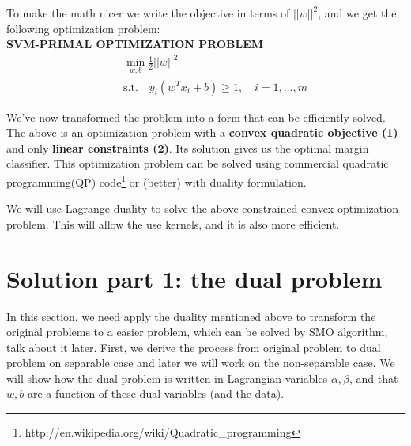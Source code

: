 \documentclass[a4paper]{article}
\begin{document}
To make the math nicer we write the objective in terms of $||w||^2$, and we get the following optimization problem:\\

\textbf{SVM-PRIMAL OPTIMIZATION PROBLEM}\\
\begin{align}
	& \min_{w, b} \frac{1}{2} ||w||^2 \\
	\quad & \text{s.t.} \quad y_i (w^T x_i + b) \geq 1, \quad i = 1, \dots, m
\end{align}

We've now transformed the problem into a form that can be efficiently solved. The above is an optimization problem with a \textbf{convex quadratic objective (1)} and only \textbf{linear constraints (2)}. Its solution gives us the optimal margin classifier. This optimization problem can be solved using commercial quadratic programming(QP) code\footnote{http://en.wikipedia.org/wiki/Quadratic\_programming} or (better) with duality formulation. 

We will use Lagrange duality to solve the above constrained convex optimization problem. This will allow the use kernels, and it is also more efficient. 




\section{Solution part 1: the dual problem}
In this section, we need apply the duality mentioned above to transform the original problems to a easier problem, which can be solved by SMO algorithm, talk about it later. First, we derive the process from original problem to dual problem on separable case and later we will work on the non-separable case. We will show how the dual problem is written in Lagrangian variables $\alpha, \beta$, and that $w, b$ are a function of these dual variables (and the data).
\end{document}
